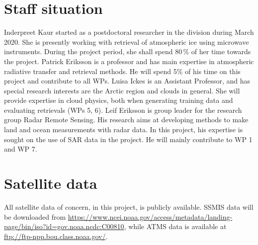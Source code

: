 \documentclass[12pt,oneside,a4paper]{article}
\begin{document}
\section{Staff situation}
\label{sec:staff}
%
Inderpreet Kaur started as a postdoctoral researcher in the division during March 2020. She is presently working with retrieval of atmospheric ice using microwave instruments. During the project period, she shall spend 80\,\% of her time towards the project. Patrick Eriksson is a professor and has main expertise in atmospheric radiative transfer and retrieval methods. He will spend 5\% of his time on this project and contribute to all WPs. Luisa Ickes is an Assistant Professor, and has special research interests are the Arctic region and clouds in general. She will provide expertise in cloud physics, both when generating training data and evaluating retrievals (WPs 5, 6). Leif Eriksson is group leader for the research group Radar Remote Sensing. His research aims at developing methods to make land and ocean measurements with radar data. In this project, his expertise is sought on the use of SAR data in the project. He will mainly contribute to WP 1 and WP 7. 

\section{Satellite data}
%
All satellite data of concern, in this project, is publicly available. SSMIS data will be downloaded from \url{ https://www.ncei.noaa.gov/access/metadata/landing-page/bin/iso?id=gov.noaa.ncdc:C00810}, while ATMS data is available at \url{ftp://ftp-npp.bou.class.noaa.gov/}.

{\footnotesize
	
}
\end{document}
